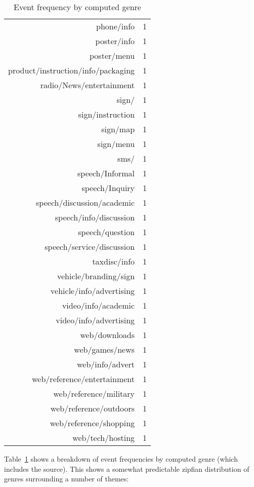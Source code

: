 \begin{table}[ht]
\begin{tabular}{rr}
      phone/info &   1 \\ 
      poster/info &   1 \\ 
      poster/menu &   1 \\ 
      product/instruction/info/packaging &   1 \\ 
      radio/News/entertainment &   1 \\ 
      sign/ &   1 \\ 
      sign/instruction &   1 \\ 
      sign/map &   1 \\ 
      sign/menu &   1 \\ 
      sms/ &   1 \\ 
      speech/Informal &   1 \\ 
      speech/Inquiry &   1 \\ 
      speech/discussion/academic &   1 \\ 
      speech/info/discussion &   1 \\ 
      speech/question &   1 \\ 
      speech/service/discussion &   1 \\ 
      taxdisc/info &   1 \\ 
      vehicle/branding/sign &   1 \\ 
      vehicle/info/advertising &   1 \\ 
      video/info/academic &   1 \\ 
      video/info/advertising &   1 \\ 
      web/downloads &   1 \\ 
      web/games/news &   1 \\ 
      web/info/advert &   1 \\ 
      web/reference/entertainment &   1 \\ 
      web/reference/military &   1 \\ 
      web/reference/outdoors &   1 \\ 
      web/reference/shopping &   1 \\ 
      web/tech/hosting &   1 \\ 
       \hline
\end{tabular}
\caption{Event frequency by computed genre}
\label{table:personal:eventcountbygenre}
\end{table}


Table~\ref{table:personal:eventcountbygenre} shows a breakdown of event frequencies by computed genre  (which includes the source).  This shows a somewhat predictable zipfian distribution of genres surrounding a number of themes:

